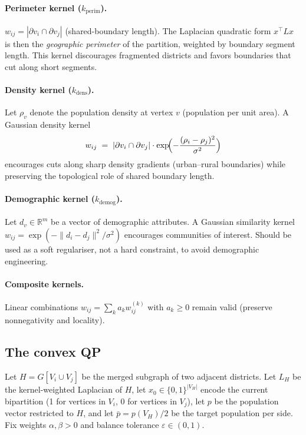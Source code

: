 \documentclass[11pt]{article}
\newcommand{\R}{\mathbb{R}}
\begin{document}
\paragraph{Perimeter kernel ($k_{\mathrm{perim}}$).} $w_{ij} = |\partial v_i \cap \partial v_j|$
(shared-boundary length). The Laplacian quadratic form $x^\top L x$
is then the \emph{geographic perimeter} of the partition, weighted by
boundary segment length. This kernel discourages fragmented districts
and favors boundaries that cut along short segments.

\paragraph{Density kernel ($k_{\mathrm{dens}}$).} Let $\rho_v$ denote
the population density at vertex $v$ (population per unit area). A
Gaussian density kernel
\[
  w_{ij} \;=\; |\partial v_i \cap \partial v_j| \cdot
  \exp\!\Bigl( -\frac{(\rho_i - \rho_j)^2}{\sigma^2} \Bigr)
\]
encourages cuts along sharp density gradients (urban--rural
boundaries) while preserving the topological role of shared boundary
length.

\paragraph{Demographic kernel ($k_{\mathrm{demog}}$).} Let
$d_v \in \R^m$ be a vector of demographic attributes. A Gaussian
similarity kernel $w_{ij} = \exp(-\|d_i - d_j\|^2 / \sigma^2)$
encourages communities of interest. Should be used as a soft
regulariser, not a hard constraint, to avoid demographic engineering.

\paragraph{Composite kernels.} Linear combinations $w_{ij} = \sum_k a_k w_{ij}^{(k)}$
with $a_k \ge 0$ remain valid (preserve nonnegativity and locality).

\subsection{The convex QP}\label{sec:qp-model}

Let $H = G[V_i \cup V_j]$ be the merged subgraph of two adjacent
districts. Let $L_H$ be the kernel-weighted Laplacian of $H$, let
$x_0 \in \{0,1\}^{|V_H|}$ encode the current bipartition (1 for
vertices in $V_i$, 0 for vertices in $V_j$), let $p$ be the population
vector restricted to $H$, and let $\bar p = p(V_H)/2$ be the target
population per side. Fix weights $\alpha, \beta > 0$ and balance
tolerance $\varepsilon \in (0, 1)$.
\end{document}
